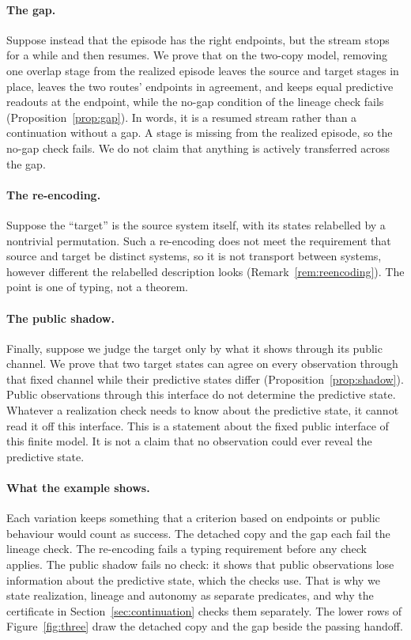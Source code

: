 \paragraph{The gap.}
Suppose instead that the episode has the right endpoints, but the stream stops
for a while and then resumes. We prove that on the two-copy model, removing one
overlap stage from the realized episode leaves the source and target stages in
place, leaves the two routes' endpoints in agreement, and keeps equal predictive
readouts at the endpoint, while the no-gap condition of the lineage check
fails
(Proposition~\ref{prop:gap}). In words, it is a resumed stream rather than a
continuation without a gap. A stage is missing from the realized episode, so
the no-gap check fails. We do not claim that anything is actively transferred
across the gap.

\paragraph{The re-encoding.}
Suppose the ``target'' is the source system itself, with its states relabelled
by a nontrivial permutation. Such a re-encoding does not meet the requirement
that source and target be distinct systems, so it is not transport between
systems, however different the relabelled description looks
(Remark~\ref{rem:reencoding}). The point is one of typing, not a theorem.

\paragraph{The public shadow.}
Finally, suppose we judge the target only by what it shows through its public
channel. We prove that two target states can agree on every observation
through that fixed channel while their predictive states differ
(Proposition~\ref{prop:shadow}). Public observations through this interface
do not determine the predictive state. Whatever a realization check needs to
know about the predictive state, it cannot read it off this interface. This is
a statement about the fixed public interface of this finite model. It is not a claim that no observation could ever reveal the
predictive state.

\paragraph{What the example shows.}
Each variation keeps something that a criterion based on endpoints or public
behaviour would count as success. The detached copy and the gap each fail the
lineage check. The re-encoding fails a typing requirement before any check
applies. The public shadow fails no check: it shows that public observations
lose information about the predictive state, which the checks use. That is why we state realization, lineage and autonomy as separate predicates,
and why the certificate in Section~\ref{sec:continuation} checks them
separately. The lower rows of Figure~\ref{fig:three} draw the detached copy and
the gap beside the passing handoff.
